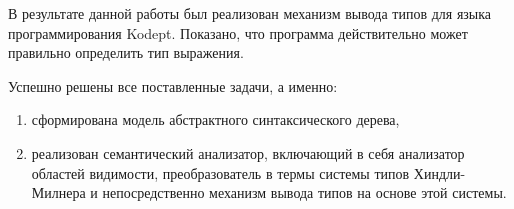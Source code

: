 ﻿%
\begin{frame}%

	В результате данной работы был реализован механизм вывода типов для языка программирования Kodept.
	Показано, что программа действительно может правильно определить тип выражения.

	Успешно решены все поставленные задачи, а именно:
	\begin{enumerate}[1)]
		\item сформирована модель абстрактного синтаксического дерева,
		\item реализован семантический анализатор, включающий в себя анализатор областей видимости, преобразователь в термы системы типов Хиндли-Милнера и непосредственно механизм вывода типов на основе этой системы.
	\end{enumerate}

\end{frame}

